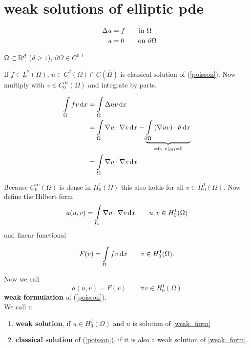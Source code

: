 \section{weak solutions of elliptic pde}

\begin{example}
	\begin{align}\label{poisson}
	-\Delta u &= f \qquad \text{in } \Omega \\
	u &= 0 \qquad \text{on } \partial \Omega \nonumber
	\end{align}
	
	$\Omega \subset \mathbb{R}^d $ ($d \geq 1$), $\partial \Omega \in C^{0,1}$
\end{example}

If $f \in L^2(\Omega)$, $u \in C^2(\Omega)\cap C(\overline{\Omega})$ is \glqq classical \grqq solution of (\ref{poisson}). Now multiply with $v \in C^\infty_0 (\Omega)$ and integrate by parts.

\begin{align*}
	\int \limits_\Omega fv \mathop{}\!\mathrm{d} x &= \int \limits_\Omega \Delta uv \mathop{}\!\mathrm{d} x\\
								   &= \int \limits_\Omega \nabla u \cdot \nabla v \mathop{}\!\mathrm{d} x - \underbrace{\int \limits_{\partial \Omega} \left( \nabla uv\right)\cdot \vartheta \mathop{}\!\mathrm{d} x}_{=0,\ v|_{\partial \Omega} = 0} \\
								   &= \int \limits_\Omega \nabla u \cdot \nabla v \mathop{}\!\mathrm{d} x
\end{align*}

Because $C^\infty_0(\Omega)$ is dense in $H^1_0(\Omega)$ this also holds for all $v \in H^1_0(\Omega)$. Now define the Hilbert form
\begin{equation*}
	a(u,v) = \int \limits_\Omega \nabla u \cdot \nabla v \mathop{}\!\mathrm{d} x \qquad u,v\in H^1_0(\Omega)
\end{equation*}
and linear functional

\begin{equation*}
	F(v) = \int \limits_\Omega fv \mathop{}\!\mathrm{d} x \qquad v \in H^1_0(\Omega).
\end{equation*}

Now we call 
\begin{equation}\label{weak_form}
	a(u,v) = F(v) \qquad \forall v \in  H^1_0(\Omega)
\end{equation}
\textbf{weak formulation} of (\ref{poisson}).\\

We call u
\begin{enumerate}[label=(\alph*)]
\item \textbf{weak solution}, if $u \in  H^1_0(\Omega)$ and $u$ is solution of \eqref{weak_form}
\item \textbf{classical solution} of (\ref{poisson}), if it is also a weak solution of \eqref{weak_form}. 
\end{enumerate}

